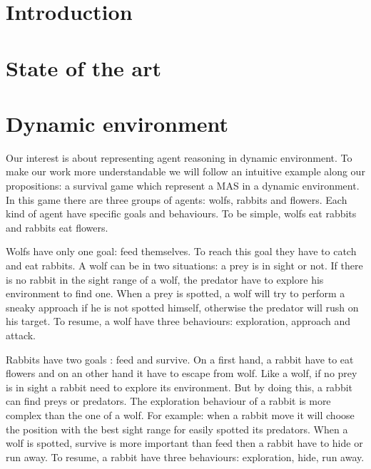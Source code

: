 \documentclass{aamas2012}
\begin{document}



\section{Introduction}

\section{State of the art}

\section{Dynamic environment}

	Our interest is about representing agent reasoning in dynamic environment.
	To make our work more understandable we will follow an intuitive example along our propositions: a survival game which represent a MAS in a dynamic environment.
	In this game there are three groups of agents: wolfs, rabbits and flowers.
	Each kind of agent have specific goals and behaviours.
	To be simple, wolfs eat rabbits and rabbits eat flowers.
	
	Wolfs have only one goal: feed themselves.
	To reach this goal they have to catch and eat rabbits.
	A wolf can be in two situations: a prey is in sight or not.
	If there is no rabbit in the sight range of a wolf, the predator have to explore his environment to find one.
	When a prey is spotted, a wolf will try to perform a sneaky approach if he is not spotted himself, otherwise the predator will rush on his target.
	To resume, a wolf have three behaviours: exploration, approach and attack.
	
	Rabbits have two goals : feed and survive.
	On a first hand, a rabbit have to eat flowers and on an other hand it have to escape from wolf.
	Like a wolf, if no prey is in sight a rabbit need to explore its environment.
	But by doing this, a rabbit can find preys or predators.
	The exploration behaviour of a rabbit is more complex than the one of a wolf.
	For example: when a rabbit move it will choose the position with the best sight range for easily spotted its predators.
	When a wolf is spotted, survive is more important than feed then a rabbit have to hide or run away.
	To resume, a rabbit have three behaviours: exploration, hide, run away.
	
\end{document}
